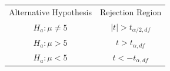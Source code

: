 \documentclass[12pt]{article}
\begin{document}
\pagestyle{empty}
\Large
{}
\pagecolor{ehandbook}

\begin{tabular}{cc}
Alternative Hypothesis &   Rejection Region             \\
$H_{a}: \mu \neq 5$    &   $ |t| >  t_{\alpha/2,df} $ \\    
$H_{a}: \mu > 5   $    &   $  t  >  t_{\alpha,df}   $ \\
$H_{a}: \mu < 5   $    &   $  t  < -t_{\alpha,df}   $ \\
\end{tabular}
\end{document}
